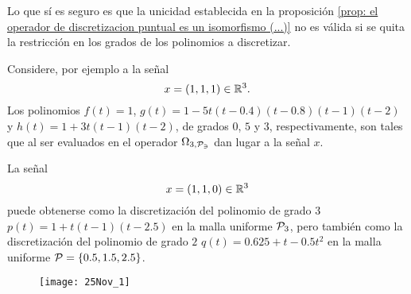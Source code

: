 \begin{ejemplo}
Lo que sí es seguro es que la unicidad establecida en la proposición \ref{prop: el operador de discretizacion puntual es un isomorfismo (...)} no es válida si se quita la restricción en los grados de los polinomios a discretizar.

Considere, por ejemplo a la señal
\[
x = (1,1,1) \in \mathbb{R}^{3}.
\]
Los polinomios 
$f(t)=1$, $g(t)= 1-5t(t-0.4)(t-0.8)(t-1)(t-2)$
y $h(t) = 1+3t(t-1)(t-2)$,
de grados $0$, $5$ y $3$, respectivamente, son tales
que al ser evaluados en el operador
$\Omega_{3, \mathcal{P_{3}}}$ dan lugar a la señal $x$.

La señal 
\[
x = (1,1,0) \in \mathbb{R}^{3}
\]
puede obtenerse como la discretización
del polinomio de grado $3$
$p(t) = 1+t(t-1)(t-2.5)$ en la  
malla uniforme $\mathcal{P}_{3}$, pero también como
la discretización del polinomio de grado $2$
$q(t)= 0.625 + t - 0.5t^{2}$
en la malla uniforme $\mathcal{P} = \{
0.5, 1.5, 2.5 \}$.

\begin{figure}[H]
	\centering
	\texttt{[image: 25Nov\_1]} 
\end{figure}	
\final 
\end{ejemplo}



